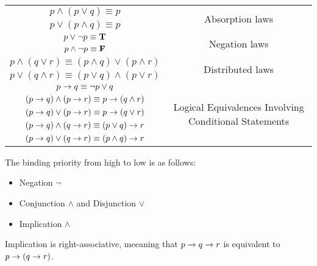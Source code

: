 \begin{center}
\begin{tabular}{|c|c|}
        $p \land (p \lor q) \equiv p$
          & \multirow{2}{*}{Absorption laws} \\
        $p \lor (p \land q) \equiv p$ & \\
        \hline

        $p \lor \lnot p \equiv \mathbf{T}$ & \multirow{2}{*}{Negation laws} \\
        $p \land \lnot p \equiv \mathbf{F}$ & \\
        \hline

        $p \land (q \lor r) \equiv (p \land q) \lor (p \land r)$
          & \multirow{2}{*}{Distributed laws} \\
        $p \lor (q \land r) \equiv (p \lor q) \land (p \lor r)$ & \\
        \hline

        $p \rightarrow q \equiv \lnot p \lor q$
        & \multirow{5}{*}{Logical Equivalences Involving Conditional Statements} \\
        $(p \rightarrow q) \land (p \rightarrow r) \equiv p \rightarrow (q \land r)$
        & \\
        $(p \rightarrow q) \lor (p \rightarrow r) \equiv p \rightarrow (q \lor r)$
        & \\
        $(p \rightarrow q) \land (q \rightarrow r) \equiv (p \lor q) \rightarrow r$
        & \\
        $(p \rightarrow q) \lor (q \rightarrow r) \equiv (p \land q) \rightarrow r$
        & \\
        \hline
      \end{tabular}
    \end{center}

  \par The binding priority from high to low is as follows:
    \begin{itemize}
      \item Negation $\lnot$
      \item Conjunction $\land$ and Disjunction $\lor$
      \item Implication $\land$
    \end{itemize}
  \par Implication is right-associative, meeaning that $p \rightarrow q \rightarrow r$ is equivalent to $p \rightarrow (q \rightarrow r)$.

